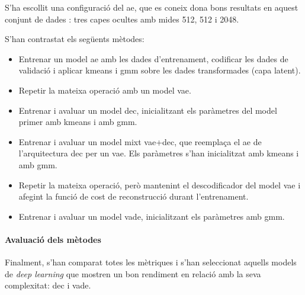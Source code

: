 \documentclass[CAT,BIB]{TFUOC}%
\begin{document}
                S'ha escollit una configuració del \gls{ae},
                que es coneix dona bons resultats en aquest conjunt de dades \citep{Xie2015}:
                tres capes ocultes amb mides 512, 512 i 2048.

                S'han contrastat els següents mètodes:

                \begin{itemize}
                    \item Entrenar un model \gls{ae} amb les dades d'entrenament,
                    codificar les dades de validació
                    i aplicar \gls{kmeans} i \gls{gmm}
                    sobre les dades transformades (capa latent).

                    \item Repetir la mateixa operació amb un model \gls{vae}.

                    \item Entrenar i avaluar un model \gls{dec},
                    inicialitzant els paràmetres del model
                    primer amb \gls{kmeans} i amb \gls{gmm}.

                    \item Entrenar i avaluar un model mixt \gls{vae}+\gls{dec},
                    que reemplaça el \gls{ae} de l'arquitectura \gls{dec}
                    per un \gls{vae}.
                    Els paràmetres s'han inicialitzat amb \gls{kmeans} i amb \gls{gmm}.

                    \item Repetir la mateixa operació,
                    però mantenint el descodificador del model \gls{vae}
                    i afegint la funció de cost de reconstrucció
                    durant l'entrenament.

                    \item Entrenar i avaluar un model \gls{vade},
                    inicialitzant els paràmetres amb \gls{gmm}.
                \end{itemize}


            \paragraph{Avaluació dels mètodes}
                Finalment,
                s'han comparat totes les mètriques
                i s'han seleccionat aquells models de \textit{deep learning}
                que mostren un bon rendiment en relació amb la seva complexitat:
                \gls{dec} i \gls{vade}.
\end{document}
